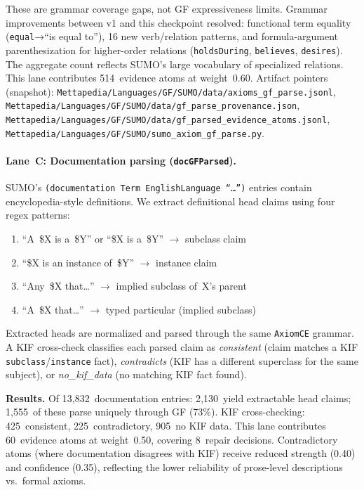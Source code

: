\documentclass[11pt]{article}
\theoremstyle{definition}
\theoremstyle{plain}
\begin{document}
These are grammar coverage gaps, not GF expressiveness
limits.  Grammar improvements between v1 and this checkpoint
resolved: functional term equality (\texttt{equal}→``is equal
to''), 16 new verb/relation patterns, and formula-argument
parenthesization for higher-order relations (\texttt{holdsDuring},
\texttt{believes}, \texttt{desires}).  The aggregate count
reflects SUMO's large vocabulary of specialized relations.
This lane contributes 514~evidence atoms at weight~0.60.
Artifact pointers (snapshot): \texttt{Mettapedia/Languages/GF/SUMO/data/axioms\_gf\_parse.jsonl},
\texttt{Mettapedia/Languages/GF/SUMO/data/gf\_parse\_provenance.json},
\texttt{Mettapedia/Languages/GF/SUMO/data/gf\_parsed\_evidence\_atoms.jsonl},
\texttt{Mettapedia/Languages/GF/SUMO/sumo\_axiom\_gf\_parse.py}.

\paragraph{Lane~C: Documentation parsing (\texttt{docGFParsed}).}
SUMO's \texttt{(documentation~Term~EnglishLanguage~``\ldots'')}
entries contain encyclopedia-style definitions.  We extract
definitional head claims using four regex patterns:
\begin{enumerate}[nosep]
  \item ``A~\$X is a~\$Y'' or ``\$X is a~\$Y'' $\to$ subclass claim
  \item ``\$X is an instance of~\$Y'' $\to$ instance claim
  \item ``Any~\$X that\ldots'' $\to$ implied subclass of~X's parent
  \item ``A~\$X that\ldots'' $\to$ typed particular (implied subclass)
\end{enumerate}

Extracted heads are normalized and parsed through the same
\texttt{AxiomCE} grammar.  A KIF cross-check classifies each
parsed claim as \emph{consistent} (claim matches a KIF
\texttt{subclass}/\texttt{instance} fact), \emph{contradicts}
(KIF has a different superclass for the same subject), or
\emph{no\_kif\_data} (no matching KIF fact found).

\medskip\noindent\textbf{Results.}
Of 13{,}832~documentation entries: 2{,}130~yield extractable
head claims; 1{,}555~of these parse uniquely through GF (73\%).
KIF cross-checking: 425~consistent, 225~contradictory,
905~no KIF data.  This lane contributes 60~evidence atoms at
weight~0.50, covering 8~repair decisions.  Contradictory atoms
(where documentation disagrees with KIF) receive reduced
strength (0.40) and confidence (0.35), reflecting the lower
reliability of prose-level descriptions vs.\ formal axioms.
\end{document}
